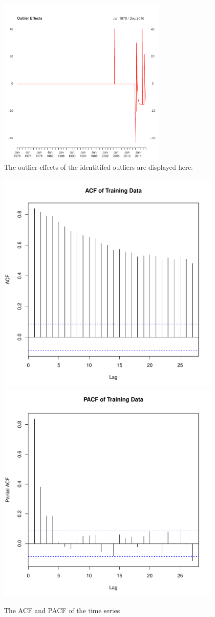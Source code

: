 \documentclass[font=12pt]{paper}
\begin{document}
\begin{figure}
\centering
    \includegraphics[width=0.75\textwidth]{../image/outlier_effects.pdf}
\caption{The outlier effects of the identitifed outliers are displayed here.}
\label{outlier}
\end{figure}



\begin{figure}
\centering
\includegraphics[width=0.45\linewidth]{../image/acf_og.pdf}
\includegraphics[width=0.45\linewidth]{../image/pacf_og.pdf}
\caption{The ACF and PACF of the time series}
\label{og_acf_pacf}
\end{figure}
\end{document}
